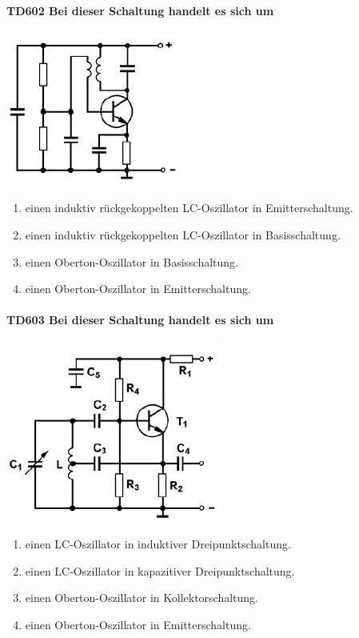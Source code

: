 \documentclass[8pt]{article}
\begin{document}
\begin{enumerate}
\begin{enumerate}[nolistsep,label=\Alph*]
\paragraph*{TD602 Bei dieser Schaltung handelt es sich um}
\begin{center}
	\begin{minipage}{\linewidth}
		\centering
		\includegraphics[scale=1.0]{pics/td602_a.jpg}
	\end{minipage}
\end{center}
\begin{enumerate}[nolistsep,label=\Alph*]
\item einen induktiv rückgekoppelten LC-Oszillator in Emitterschaltung.
\item einen induktiv rückgekoppelten LC-Oszillator in Basisschaltung.
\item einen Oberton-Oszillator in Basisschaltung.
\item einen Oberton-Oszillator in Emitterschaltung.
\end{enumerate}

\paragraph*{TD603 Bei dieser Schaltung handelt es sich um} 
\begin{center}
	\begin{minipage}{\linewidth}
		\centering
		\includegraphics[scale=1.0]{pics/td603_a.jpg}
	\end{minipage}
\end{center}
\begin{enumerate}[nolistsep,label=\Alph*]
\item einen LC-Oszillator in induktiver Dreipunktschaltung.
\item einen LC-Oszillator in kapazitiver Dreipunktschaltung.
\item einen Oberton-Oszillator in Kollektorschaltung.
\item einen Oberton-Oszillator in Emitterschaltung.
\end{enumerate}


\end{enumerate}
\end{enumerate}
\end{document}
